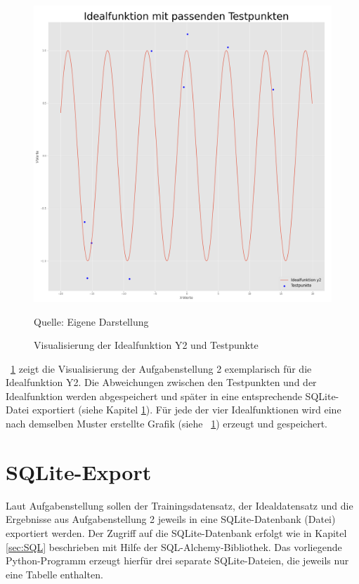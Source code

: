 \documentclass[
    a4paper, 								%
    oneside, 								%
    11pt, 									%
    listof=totoc, 					%
    bibliography=totoc, 		%
    final, 									%
    numbers=noenddot
]{scrreprt}
\newcommand{\abbildung}[1]{\figurename\ \ref{#1}}
\begin{document}
\begin{figure}[!h]
	\caption{Visualisierung der Idealfunktion Y2 und Testpunkte}
	\vspace{6pt}
	\centering
	\includegraphics[scale=0.21]			  {Idealfuntionfunktion_y2_Testpunkte_text}
	\vspace{6pt}
	
	Quelle: Eigene Darstellung
	\label{fig:Ideal2}
\end{figure}

\abbildung{fig:Ideal2} zeigt die Visualisierung der Aufgabenstellung 2 exemplarisch für die Idealfunktion Y2. Die Abweichungen zwischen den Testpunkten und der Idealfunktion werden abgespeichert und später in eine entsprechende SQLite-Datei exportiert (siehe Kapitel \ref{sec:sqlite}). Für jede der vier Idealfunktionen wird eine nach demselben Muster erstellte Grafik (siehe \abbildung{fig:Ideal2}) erzeugt und gespeichert. 

\section{SQLite-Export}
\label{sec:sqlite}
Laut Aufgabenstellung sollen der Trainingsdatensatz, der Idealdatensatz und die Ergebnisse aus Aufgabenstellung 2 jeweils in eine SQLite-Datenbank (Datei) exportiert werden. Der Zugriff auf die SQLite-Datenbank erfolgt wie in Kapitel \ref{sec:SQL} beschrieben  mit Hilfe der SQL-Alchemy-Bibliothek. Das vorliegende Python-Programm erzeugt hierfür drei separate SQLite-Dateien, die jeweils nur eine Tabelle enthalten. 
\end{document}
